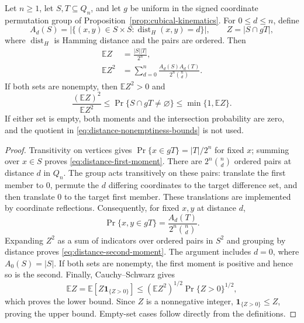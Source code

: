 \begin{proposition}
\label{prop:distance-intersection-moments}
Let $n\ge1$, let $S,T\subseteq Q_n$, and let $g$ be uniform in the
signed coordinate permutation group of
Proposition~\ref{prop:cubical-kinematics}. For $0\le d\le n$, define
\[
 A_d(S)=|\{(x,y)\in S\times S:\operatorname{dist}_H(x,y)=d\}|,
 \qquad Z=|S\cap gT|,
\]
where $\operatorname{dist}_H$ is Hamming distance and the pairs are ordered.
Then
\begin{align}
 \mathbb E Z&=\frac{|S||T|}{2^n},\label{eq:distance-first-moment}\\
 \mathbb E Z^2&=\sum_{d=0}^n
       \frac{A_d(S)A_d(T)}{2^n\binom nd}.
       \label{eq:distance-second-moment}
\end{align}
If both sets are nonempty, then $\mathbb E Z^2>0$ and
\begin{equation}
 \frac{(\mathbb E Z)^2}{\mathbb E Z^2}
 \le \Pr\{S\cap gT\ne\varnothing\}
 \le \min\{1,\mathbb E Z\}.
 \label{eq:distance-nonemptiness-bounds}
\end{equation}
If either set is empty, both moments and the intersection probability
are zero, and the quotient in \eqref{eq:distance-nonemptiness-bounds}
is not used.
\end{proposition}
\begin{proof}
Transitivity on vertices gives
$\Pr\{x\in gT\}=|T|/2^n$ for fixed $x$; summing over $x\in S$
proves \eqref{eq:distance-first-moment}.
There are $2^n\binom nd$ ordered pairs at distance $d$ in $Q_n$.
The group acts transitively on these pairs: translate the first member
to $0$, permute the $d$ differing coordinates to the target difference
set, and then translate $0$ to the target first member. These translations
are implemented by coordinate reflections. Consequently, for fixed $x,y$ at
distance $d$,
\[
 \Pr\{x,y\in gT\}
       =\frac{A_d(T)}{2^n\binom nd}.
\]
Expanding $Z^2$ as a sum of indicators over ordered pairs in $S^2$
and grouping by distance proves \eqref{eq:distance-second-moment}.
The argument includes $d=0$, where $A_0(S)=|S|$.
If both sets are nonempty, the first moment is positive and hence so
is the second. Finally, Cauchy--Schwarz gives
\[
 \mathbb E Z
 =\mathbb E[Z\mathbf 1_{\{Z>0\}}]
 \le (\mathbb E Z^2)^{1/2}\Pr\{Z>0\}^{1/2},
\]
which proves the lower bound. Since $Z$ is a nonnegative integer,
$\mathbf 1_{\{Z>0\}}\le Z$, proving the upper bound. Empty-set cases
follow directly from the definitions.
\end{proof}
